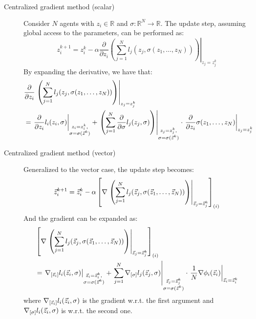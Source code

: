 \begin{description}
    \item[Centralized gradient method (scalar)] 
        Consider $N$ agents with $z_i \in \mathbb{R}$ and $\sigma: \mathbb{R}^N \rightarrow \mathbb{R}$. The update step, assuming global access to the parameters, can be performed as:
        \[
            z_i^{k+1} = z_i^k - \alpha \frac{\partial}{\partial z_i} \left.\left( \sum_{j=1}^{N} l_j(z_j, \sigma(z_1, \dots, z_N)) \right) \right|_{z_j=z_j^k}
        \]
        By expanding the derivative, we have that:
        \[
            \begin{split}
                &\frac{\partial}{\partial z_i} \left.\left( \sum_{j=1}^{N} l_j(z_j, \sigma(z_1, \dots, z_N)) \right) \right|_{z_j=z_j^k} \\
                &= 
                    \left.\frac{\partial}{\partial z_i} l_i(z_i, \sigma) \right|_{\substack{z_i = z_i^k,\\\sigma = \sigma({\vec{z}}^k)}} + 
                    \left.\left(\sum_{j=1}^{N} \frac{\partial}{\partial \sigma} l_j(z_j, \sigma) \right)\right|_{\substack{z_j = z_j^k,\\\sigma = \sigma({\vec{z}}^k)}} \cdot
                    \left.\frac{\partial}{\partial z_i} \sigma(z_1, \dots, z_N)\right|_{\substack{z_j=z_j^k}}
            \end{split}
        \]

    \item[Centralized gradient method (vector)] 
        Generalized to the vector case, the update step becomes:
        \[
            {\vec{z}}_i^{k+1} = {\vec{z}}_i^k - \alpha \left[ \nabla \left.\left( \sum_{j=1}^{N} l_j({\vec{z}}_j, \sigma({\vec{z}}_1, \dots, {\vec{z}}_N)) \right) \right|_{{\vec{z}}_j={\vec{z}}_j^k} \right]_{(i)}
        \]
        And the gradient can be expanded as:
        \[
            \begin{split}
                &\left[ \nabla \left.\left( \sum_{j=1}^{N} l_j({\vec{z}}_j, \sigma({\vec{z}}_1, \dots, {\vec{z}}_N)) \right) \right|_{{\vec{z}}_j={\vec{z}}_j^k} \right]_{(i)} \\
                &= 
                    \left.\nabla_{[{\vec{z}}_i]} l_i({\vec{z}}_i, \sigma)\right|_{\substack{{\vec{z}}_i={\vec{z}}_i^k,\\\sigma=\sigma({\vec{z}}^k)}} +
                    \left.\sum_{j=1}^{N} \nabla_{[\sigma]} l_j({\vec{z}}_j, \sigma)\right|_{\substack{{\vec{z}}_j={\vec{z}}_j^k\\\sigma=\sigma({\vec{z}}^k)}} \cdot
                    \left.\frac{1}{N}\nabla \phi_i({\vec{z}}_i)\right|_{{\vec{z}}_i={\vec{z}}_i^k} 
            \end{split}
        \]
        where $\nabla_{[{\vec{z}}_i]} l_i({\vec{z}}_i, \sigma)$ is the gradient w.r.t. the first argument and $\nabla_{[\sigma]} l_i({\vec{z}}_i, \sigma)$ is w.r.t. the second one.
\end{description}


